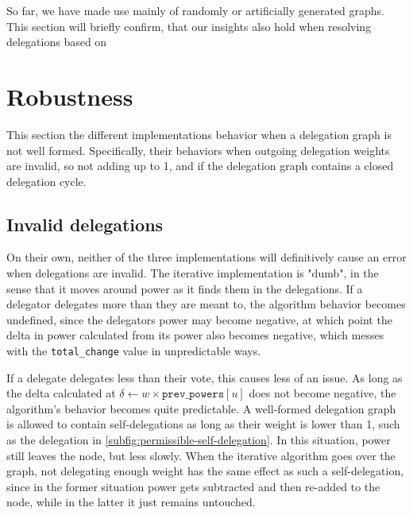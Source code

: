 So far, we have made use mainly of randomly or artificially generated graphs. This section will briefly confirm, that our insights also hold when resolving delegations based on 





\section{Robustness}

This section the different implementations behavior when a delegation graph is not well formed. Specifically, their behaviors when outgoing delegation weights are invalid, so not adding up to 1, and if the delegation graph contains a closed delegation cycle. 

\subsection{Invalid delegations}

On their own, neither of the three implementations will definitively cause an error when delegations are invalid. The iterative implementation is "dumb", in the sense that it moves around power as it finds them in the delegations. If a delegator delegates more than they are meant to, the algorithm behavior becomes undefined, since the delegators power may become negative, at which point the delta in power calculated from its power also becomes negative, which messes with the \texttt{total\_change} value in unpredictable ways. 

If a delegate delegates less than their vote, this causes less of an issue. As long as the delta calculated at $\delta \gets w \times \texttt{prev\_powers}[u]$ does not become negative, the algorithm's behavior becomes quite predictable. A well-formed delegation graph is allowed to contain self-delegations as long as their weight is lower than 1, such as the delegation in \cref{subfig:permissible-self-delegation}. In this situation, power still leaves the node, but less slowly. When the iterative algorithm goes over the graph, not delegating enough weight has the same effect as such a self-delegation, since in the former situation  power gets subtracted and then re-added to the node, while in the latter it just remains untouched.

